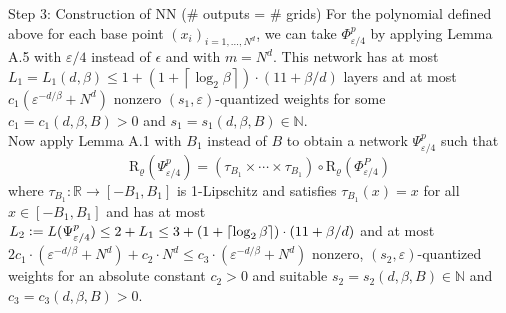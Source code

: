 \documentclass{if-beamer}
\newcommand{\defeq}{\vcentcolon=}
\begin{document}
\begin{frame}{Step 3: Construction of NN (\# outputs = \# grids)}
    For the polynomial defined above for each base point $(x_i)_{i=1,\dots,N^d}$, we can take $\Phi^p_{\varepsilon/4}$ by applying Lemma A.5 with $\varepsilon/4$ instead of $\epsilon$ and with $m=N^d$. This network has at most $L_1 = L_1(d, \beta) \leq 1+\left(1+\left\lceil\log _{2} \beta\right\rceil\right) \cdot(11+\beta / d)$ layers and at most $c_1 \left(\varepsilon^{-d / \beta}+N^d\right)$ nonzero $(s_1, \varepsilon)$-quantized weights for some $c_1=c_1(d,\beta,B)>0$ and $s_1=s_1(d,\beta,B)\in \mathbb{N}$.\\
    Now apply Lemma A.1 with $B_1$ instead of $B$ to obtain a network $\Psi^p_{\varepsilon/4}$ such that 
    $$\mathrm{R}_{\varrho}\left(\Psi_{\varepsilon / 4}^{p}\right)=\left(\tau_{B_{1}} \times \cdots \times \tau_{B_{1}}\right) \circ \mathrm{R}_{\varrho}\left(\Phi_{\varepsilon / 4}^{P}\right)$$
    where $\tau_{B_{1}}: \mathbb{R} \rightarrow\left[-B_{1}, B_{1}\right]$ is 1-Lipschitz and satisfies $\tau_{B_{1}}(x)=x$ for all $x \in\left[-B_{1}, B_{1}\right]$ and has at most $L_2 \defeq L(\Psi_{\varepsilon / 4}^{p}) \leq 2 + L_1 \leq 3+\left(1+\left\lceil\log _{2} \beta\right\rceil\right)\cdot(11+\beta / d)$ and at most $2 c_{1} \cdot\left(\varepsilon^{-d / \beta}+N^{d}\right)+c_{2} \cdot N^{d} \leq c_{3} \cdot\left(\varepsilon^{-d / \beta}+N^{d}\right)$ nonzero, $\left(s_{2}, \varepsilon\right)$-quantized weights for an absolute constant $c_{2}>0$ and suitable $s_{2}=s_{2}(d, \beta, B) \in \mathbb{N}$ and $c_{3}=c_{3}(d, \beta, B)>0$. 
\end{frame}
\end{document}
